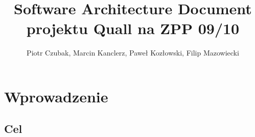 \documentclass[12pt,a4paper,twoside]{article}
\author{Piotr Czubak, Marcin Kanclerz, Paweł Kozłowski, Filip Mazowiecki}
\title{Software Architecture Document projektu Quall na ZPP 09/10}
\begin{document}
\maketitle

\newpage

\tableofcontents

\newpage




\section{Wprowadzenie}


\subsection{Cel}


\end{document}
